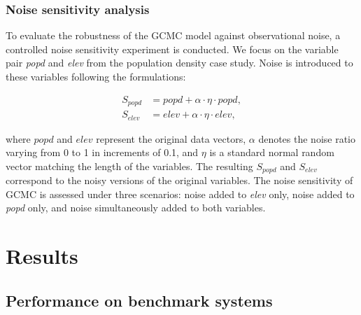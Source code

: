 \documentclass[authoryear,preprint,review,12pt]{elsarticle}
\begin{document}
\subsubsection{Noise sensitivity analysis}

To evaluate the robustness of the GCMC model against observational noise, a controlled noise sensitivity experiment is conducted. We focus on the variable pair \textit{popd} and \textit{elev} from the population density case study. Noise is introduced to these variables following the formulations:

\begin{equation}\label{eq-sensitivity}
\begin{aligned}
S_{popd} &= popd + \alpha \cdot \eta \cdot popd, \\
S_{elev} &= elev + \alpha \cdot \eta \cdot elev,
\end{aligned}
\end{equation}

\noindent where \(popd\) and \(elev\) represent the original data vectors, \(\alpha\) denotes the noise ratio varying from 0 to 1 in increments of 0.1, and \(\eta\) is a standard normal random vector matching the length of the variables. The resulting \(S_{popd}\) and \(S_{elev}\) correspond to the noisy versions of the original variables. The noise sensitivity of GCMC is assessed under three scenarios: noise added to \textit{elev} only, noise added to \textit{popd} only, and noise simultaneously added to both variables.

\section{Results}\label{sec3} 

\subsection{Performance on benchmark systems}\label{benchmark}
\end{document}

